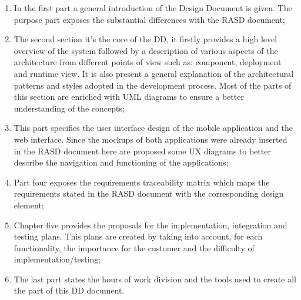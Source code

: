 \begin{enumerate}
  \item In the first part a general introduction of the Design Document is given. The purpose part exposes the substantial differences with the RASD document;
  \item The second section it's the core of the DD, it firstly provides a high level overview of the system followed by  a description of various aspects of the architecture from different points of view such as: component, deployment and runtime view. It is also present a general explanation of the architectural patterns and styles adopted in the development process. Most of the parts of this section are enriched with UML diagrams to ensure a better understanding of the concepts;
  \item This part specifies the user interface design of the mobile application and the web interface. Since the mockups of both applications were already inserted in the RASD document here are proposed some UX diagrams to better describe the navigation and functioning of the applications;
  \item Part four exposes the requirements traceability matrix which maps the requirements stated in the RASD document with the corresponding design element;
  \item Chapter five provides the proposals for the implementation, integration and testing plans. This plans are created by taking into account, for each functionality, the importance for the customer and the difficulty of implementation/testing;
  \item The last part states the hours of work division and the tools used to create  all the part of this DD document.
\end{enumerate}
